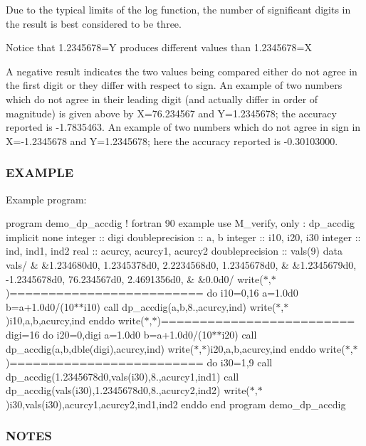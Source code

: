 \begin{DoxyVerb}
Due to the typical limits of the log function, the number of
significant digits in the result is best considered to be three.

Notice that 1.2345678=Y produces different values than 1.2345678=X

A negative result indicates the two values being compared either do
not agree in the first digit or they differ with respect to sign. An
example of two numbers which do not agree in their leading digit (and
actually differ in order of magnitude) is given above by X=76.234567
and Y=1.2345678; the accuracy reported is -1.7835463. An example of
two numbers which do not agree in sign in X=-1.2345678 and Y=1.2345678;
here the accuracy reported is -0.30103000.
\end{DoxyVerb}


\subsubsection*{E\+X\+A\+M\+P\+LE}

Example program\+:

program demo\+\_\+dp\+\_\+accdig ! fortran 90 example use M\+\_\+verify, only \+: dp\+\_\+accdig implicit none integer \+:\+: digi doubleprecision \+:\+: a, b integer \+:\+: i10, i20, i30 integer \+:\+: ind, ind1, ind2 real \+:\+: acurcy, acurcy1, acurcy2 doubleprecision \+:\+: vals(9) data vals/ \& \&1.\+234680d0, 1.\+2345378d0, 2.\+2234568d0, 1.\+2345678d0, \& \&1.\+2345679d0, -\/1.\+2345678d0, 76.\+234567d0, 2.\+4691356d0, \& \&0.\+0d0/ write($\ast$,$\ast$)\textquotesingle{}=========================\textquotesingle{} do i10=0,16 a=1.\+0d0 b=a+1.0d0/(10$\ast$$\ast$i10) call dp\+\_\+accdig(a,b,8.,acurcy,ind) write($\ast$,$\ast$)i10,a,b,acurcy,ind enddo write($\ast$,$\ast$)\textquotesingle{}=========================\textquotesingle{} digi=16 do i20=0,digi a=1.\+0d0 b=a+1.0d0/(10$\ast$$\ast$i20) call dp\+\_\+accdig(a,b,dble(digi),acurcy,ind) write($\ast$,$\ast$)i20,a,b,acurcy,ind enddo write($\ast$,$\ast$)\textquotesingle{}=========================\textquotesingle{} do i30=1,9 call dp\+\_\+accdig(1.\+2345678d0,vals(i30),8.,acurcy1,ind1) call dp\+\_\+accdig(vals(i30),1.\+2345678d0,8.,acurcy2,ind2) write($\ast$,$\ast$)i30,vals(i30),acurcy1,acurcy2,ind1,ind2 enddo end program demo\+\_\+dp\+\_\+accdig

\subsubsection*{N\+O\+T\+ES}

